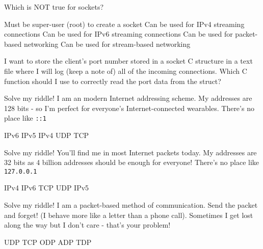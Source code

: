 \variant
Which is NOT true for sockets?
\begin{answers}
\correctanswer Must be super-user (root) to create a socket
\answer Can be used for IPv4 streaming connections
\answer Can be used for IPv6 streaming connections
\answer Can be used for packet-based networking
\answer Can be used for stream-based networking
\end{answers}
\begin{solution}
\end{solution}

\variant
I want to store the client's port number stored in a socket C structure in a text file where I will log (keep a note of) all of the incoming connections. Which C function should I use to correctly read the port data from the struct?
\begin{answers}
\end{answers}
\begin{solution}
\end{solution}

\variant
Solve my riddle! I am an modern Internet addressing scheme. My addresses are 128 bits -  so I'm perfect for everyone's Internet-connected wearables. There's no place like {\tt ::1}
\begin{answers}
\correctanswer  IPv6
\answer IPv5
\answer IPv4
\answer  UDP
\answer TCP
\end{answers}
\begin{solution}
\end{solution}

\variant
Solve my riddle! You'll find me in most Internet packets today. My addresses are 32 bits as 4 billion addresses should be enough for everyone! There's no place like {\tt 127.0.0.1}
\begin{answers}
\correctanswer IPv4
\answer IPv6
\answer TCP
\answer UDP
\answer IPv5
\end{answers}
\begin{solution}
\end{solution}

\variant
Solve my riddle! I am a packet-based method of communication. Send the packet and forget! (I behave more like a letter than a phone call). Sometimes I get lost along the way but I don't care - that's your problem!
\begin{answers}
\correctanswer UDP
\answer TCP
\answer ODP
\answer ADP
\answer TDP
\end{answers}
\begin{solution}
\end{solution}

